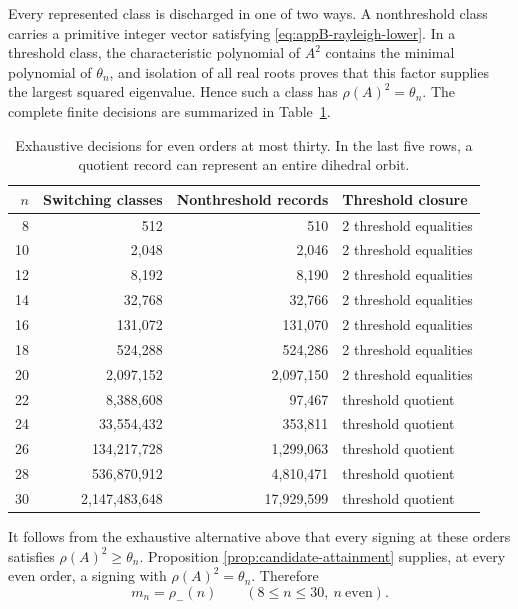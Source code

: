 Every represented class is discharged in one of two ways.  A nonthreshold
class carries a primitive integer vector satisfying
\eqref{eq:appB-rayleigh-lower}. In a threshold class, the
characteristic polynomial of \(A^2\) contains the minimal polynomial of
\(\theta_n\), and isolation of all real roots proves that this factor
supplies the largest squared eigenvalue.  Hence such a class has
\(\rho(A)^2=\theta_n\).  The complete finite decisions are summarized in
Table~\ref{tab:appB-small-orders}.

\begin{table}[t]
\centering
\caption{Exhaustive decisions for even orders at most thirty. In the
last five rows, a quotient record can represent an entire dihedral orbit.}
\label{tab:appB-small-orders}
\begin{tabular}{@{}r r r l@{}}
\toprule
\(n\)&Switching classes&Nonthreshold records&Threshold closure\\
\midrule
8  &512          &510       &2 threshold equalities\\
10 &2,048        &2,046     &2 threshold equalities\\
12 &8,192        &8,190     &2 threshold equalities\\
14 &32,768       &32,766    &2 threshold equalities\\
16 &131,072      &131,070   &2 threshold equalities\\
18 &524,288      &524,286   &2 threshold equalities\\
20 &2,097,152    &2,097,150 &2 threshold equalities\\
22 &8,388,608    &97,467    &threshold quotient\\
24 &33,554,432   &353,811   &threshold quotient\\
26 &134,217,728  &1,299,063 &threshold quotient\\
28 &536,870,912  &4,810,471 &threshold quotient\\
30 &2,147,483,648&17,929,599&threshold quotient\\
\bottomrule
\end{tabular}
\end{table}

It follows from the exhaustive alternative above that every signing at these
orders satisfies \(\rho(A)^2\geq\theta_n\).  Proposition
\ref{prop:candidate-attainment} supplies, at every even order, a signing with
\(\rho(A)^2=\theta_n\).  Therefore
\begin{equation}\label{eq:appB-small-equality}
 m_n=\rho_-(n)
 \qquad(8\leq n\leq30,\ n\ \text{even}).
\end{equation}

